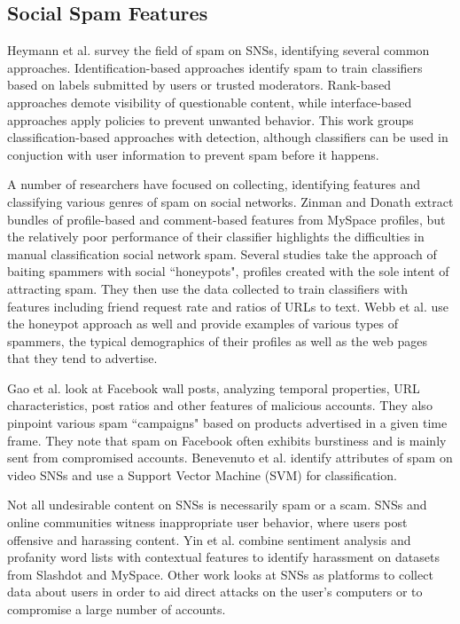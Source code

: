 \documentclass[preprint]{acm_proc_article-sp}
\begin{document}
\subsection{Social Spam Features}

Heymann et al. \cite{heymann} survey the field of spam on SNSs, identifying several common approaches. Identification-based approaches identify spam to train classifiers based on labels submitted by users or trusted moderators. Rank-based approaches demote visibility of questionable content, while interface-based approaches apply policies to prevent unwanted behavior. This work groups classification-based approaches with detection, although classifiers can be used in conjuction with user information to prevent spam before it happens.

A number of researchers have focused on collecting, identifying features and classifying various genres of spam on social networks. Zinman and Donath \cite{zinman} extract bundles of profile-based and comment-based features from MySpace profiles, but the relatively poor performance of their classifier highlights the difficulties in manual classification social network spam. Several studies take the approach of baiting spammers with social ``honeypots", profiles created with the sole intent of attracting spam.\cite{stringhini, lee} They then use the data collected to train classifiers with features including friend request rate and ratios of URLs to text. Webb et al. \cite{webb} use the honeypot approach as well and provide examples of various types of spammers, the typical demographics of their profiles as well as the web pages that they tend to advertise. 

Gao et al. \cite{gao} look at Facebook wall posts, analyzing temporal properties, URL characteristics, post ratios and other features of malicious accounts. They also pinpoint various spam ``campaigns" based on products advertised in a given time frame. They note that spam on Facebook often exhibits burstiness and is mainly sent from compromised accounts. Benevenuto et al. \cite{benevenuto} identify attributes of spam on video SNSs and use a Support Vector Machine (SVM) for classification.

Not all undesirable content on SNSs is necessarily spam or a scam. SNSs and online communities witness inappropriate user behavior, where users post offensive and harassing content. Yin et al. \cite{yin} combine sentiment analysis and profanity word lists with contextual features to identify harassment on datasets from Slashdot and MySpace. Other work looks at SNSs as platforms to collect data about users in order to aid direct attacks on the user's computers or to compromise a large number of accounts. \cite{patsakis, huber}
\end{document}
